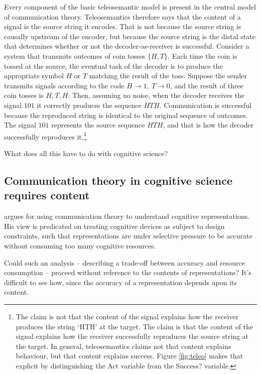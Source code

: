 \documentclass[12pt]{article}
\begin{document}
% 

Every component of the basic teleosemantic model is present in the central model of communication theory.
Teleosemantics therefore says that the content of a signal is the source string it encodes.
That is not because the source string is causally upstream of the encoder, but because the source string is the distal state that determines whether or not the decoder-as-receiver is successful.
Consider a system that transmits outcomes of coin tosses $\{H,T\}$.
Each time the coin is tossed at the source, the eventual task of the decoder is to produce the appropriate symbol $H$ or $T$ matching the result of the toss.
Suppose the sender transmits signals according to the code $H\rightarrow1,\ T\rightarrow0$, and the result of three coin tosses is $H, T, H$.
Then, assuming no noise, when the decoder receives the signal $101$ it correctly produces the sequence $HTH$.
Communication is successful because the reproduced string is identical to the original sequence of outcomes.
The signal $101$ represents the source sequence $HTH$, and that is how the decoder successfully reproduces it.\footnote{The claim is not that the content of the signal explains how the receiver produces the string `HTH' at the target. The claim is that the content of the signal explains how the receiver successfully reproduces the source string at the target. In general, teleosemantics claims not that content explains behaviour, but that content explains success. Figure \ref{fig:teleo} makes that explicit by distinguishing the Act variable from the Success? variable.}

What does all this have to do with cognitive science?

\subsection{Communication theory in cognitive science requires content}

\citet{martinez2019deception,martinez2019representations} argues for using communication theory to understand cognitive representations.
His view is predicated on treating cognitive devices as subject to design constraints, such that representations are under selective pressure to be accurate without consuming too many cognitive resources.

Could such an analysis -- describing a trade-off between accuracy and resource consumption -- proceed without reference to the contents of representations?
It's difficult to see how, since the accuracy of a representation depends upon its content.
\end{document}
